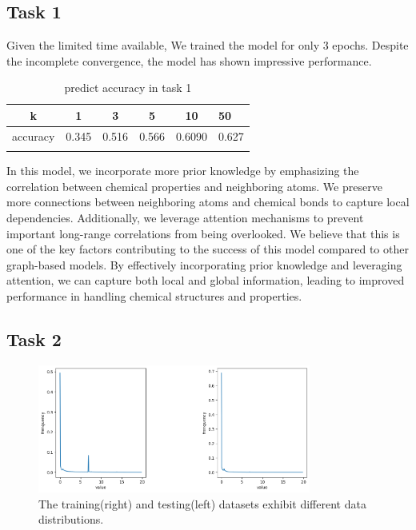 \documentclass{article}
\begin{document}
\subsection{Task 1}

Given the limited time available, We trained the model for only 3 epochs. Despite the incomplete convergence, the model has shown impressive performance.

\begin{table}[H]
  \caption{predict accuracy in task 1}
  \centering
  \begin{tabular}{cccccl}
  \hline
  \multicolumn{1}{|c|}{k}        & \multicolumn{1}{c|}{1}     & \multicolumn{1}{c|}{3}     & \multicolumn{1}{c|}{5}     & \multicolumn{1}{c|}{10}     & \multicolumn{1}{l|}{50}    \\ \hline
  \multicolumn{1}{|c|}{accuracy} & \multicolumn{1}{c|}{0.345} & \multicolumn{1}{c|}{0.516} & \multicolumn{1}{c|}{0.566} & \multicolumn{1}{c|}{0.6090} & \multicolumn{1}{l|}{0.627} \\ \hline
  \multicolumn{1}{l}{}           & \multicolumn{1}{l}{}       & \multicolumn{1}{l}{}       & \multicolumn{1}{l}{}       & \multicolumn{1}{l}{}        &                           
  \end{tabular}
  \end{table}


In this model, we incorporate more prior knowledge by emphasizing the correlation between chemical properties and neighboring atoms. We preserve more connections between neighboring atoms and chemical bonds to capture local dependencies. Additionally, we leverage attention mechanisms to prevent important long-range correlations from being overlooked. We believe that this is one of the key factors contributing to the success of this model compared to other graph-based models. By effectively incorporating prior knowledge and leveraging attention, we can capture both local and global information, leading to improved performance in handling chemical structures and properties.

\subsection{Task 2}


\begin{figure}[H]
  \centering
  \includegraphics[width=0.8\textwidth]{f.png}
  \caption{The training(right) and testing(left) datasets exhibit different data distributions.}
\end{figure}
\end{document}
